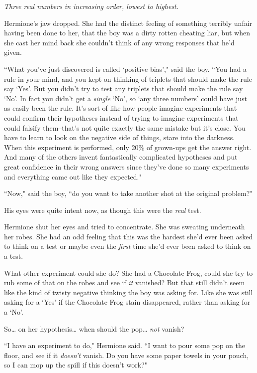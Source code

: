 \emph{Three real numbers in increasing order, lowest to highest.}

Hermione's jaw dropped. She had the distinct feeling of something terribly unfair having been done to her, that the boy was a dirty rotten cheating liar, but when she cast her mind back she couldn't think of any wrong responses that he'd given.

``What you've just discovered is called `positive bias'," said the boy. ``You had a rule in your mind, and you kept on thinking of triplets that should make the rule say `Yes'. But you didn't try to test any triplets that should make the rule say `No'. In fact you didn't get a \emph{single} `No', so `any three numbers' could have just as easily been the rule. It's sort of like how people imagine experiments that could confirm their hypotheses instead of trying to imagine experiments that could falsify them\---that's not quite exactly the same mistake but it's close. You have to learn to look on the negative side of things, stare into the darkness. When this experiment is performed, only 20\% of grown-ups get the answer right. And many of the others invent fantastically complicated hypotheses and put great confidence in their wrong answers since they've done so many experiments and everything came out like they expected."

``Now," said the boy, ``do you want to take another shot at the original problem?"

His eyes were quite intent now, as though this were the \emph{real} test.

Hermione shut her eyes and tried to concentrate. She was sweating underneath her robes. She had an odd feeling that this was the hardest she'd ever been asked to think on a test or maybe even the \emph{first} time she'd ever been asked to think on a test.

What other experiment could she do? She had a Chocolate Frog, could she try to rub some of that on the robes and see if \emph{it} vanished? But that still didn't seem like the kind of twisty negative thinking the boy was asking for. Like she was still asking for a `Yes' if the Chocolate Frog stain disappeared, rather than asking for a `No'.

So{\ldots} on her hypothesis{\ldots} when should the pop{\ldots} \emph{not} vanish?

``I have an experiment to do," Hermione said. ``I want to pour some pop on the floor, and see if it \emph{doesn't} vanish. Do you have some paper towels in your pouch, so I can mop up the spill if this doesn't work?"

